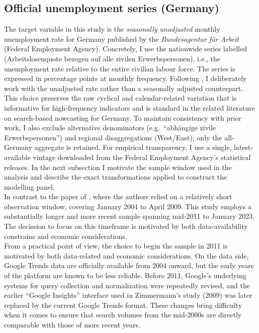 \documentclass[12pt,a4paper]{article}
\begin{document}
\subsection{Official unemployment series (Germany)}
The target variable in this study is the \emph{seasonally unadjusted} monthly unemployment rate for Germany published by the \textit{Bundesagentur für Arbeit} (Federal Employment Agency). Concretely, I use the nationwide series labelled (Arbeitslosenquote bezogen auf alle zivilen Erwerbspersonen), i.e., the unemployment rate relative to the entire civilian labour force. The series is expressed in percentage points at monthly frequency.
Following \textcite{Zimmermann2012}, I deliberately work with the unadjusted rate rather than a seasonally adjusted counterpart. This choice preserves the raw cyclical and calendar-related variation that is informative for high-frequency indicators and is standard in the related literature on search-based nowcasting for Germany. To maintain consistency with prior work, I also exclude alternative denominators (e.g.\ “abhängige zivile Erwerbspersonen”) and regional disaggregations (West/East); only the all-Germany aggregate is retained.
For empirical transparency, I use a single, latest-available vintage downloaded from the Federal Employment Agency’s statistical releases. In the next subsection I motivate the sample window used in the analysis and describe the exact transformations applied to construct the modelling panel.\\
In contrast to the paper of \textcite{Zimmermann2012}, where the authors relied on a relatively short observation window, covering January 2004 to April 2009. This study employs a substantially longer and more recent sample spanning mid-2011 to January 2023.
The decission to focus on this timeframe is motivated by both data-availability constrains and economic considerations.\\
From a practical point of view, the choice to begin the sample in 2011 is motivated by both data-related and economic considerations.
On the data side, Google Trends data are officially available from 2004 onward, but the early years of the platform are known to be less reliable. Before 2011, Google’s underlying systems for query collection and normalization were repeatedly revised, and the earlier “Google Insights” interface used in Zimmermann’s study (2009) was later replaced by the current Google Trends format.
These changes bring difficulty when it comes to ensure that search volumes from the mid-2000s are directly comparable with those of more recent years.
\end{document}
